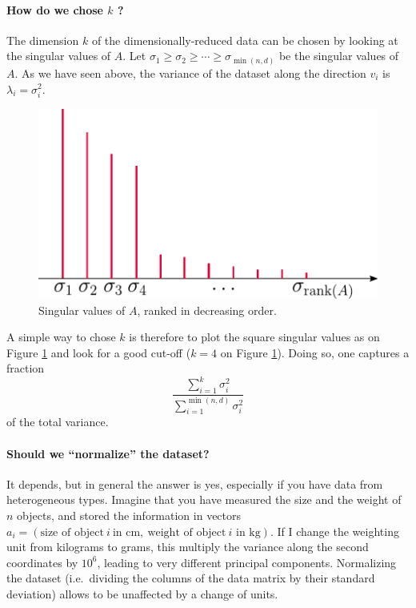 \documentclass[11pt,nocut]{article}
\begin{document}
\paragraph{How do we chose $k$ ?}
The dimension $k$ of the dimensionally-reduced data can be chosen by looking at the singular values of $A$. Let $\sigma_1 \geq \sigma_2 \geq \cdots \geq \sigma_{\min(n,d)}$ be the singular values of $A$. As we have seen above, the variance of the dataset along the direction $v_i$ is $\lambda_i = \sigma_i^2$.

\begin{figure}[h!]
	\begin{center}
	\includegraphics[width = 0.7\linewidth]{figures/elbow.pdf}
	\end{center}
	\caption{Singular values of $A$, ranked in decreasing order.}
	\label{fig:elbow}
\end{figure}

A simple way to chose $k$ is therefore to plot the square singular values as on Figure \ref{fig:elbow} and look for a good cut-off ($k=4$ on Figure \ref{fig:elbow}). Doing so, one captures a fraction
$$
\frac{\sum_{i=1}^k \sigma_i^2}{\sum_{i=1}^{\min(n,d)} \sigma_i^2}
$$
of the total variance.

\paragraph{Should we ``normalize'' the dataset?}
It depends, but in general the answer is yes, especially if you have data from heterogeneous types.
Imagine that you have measured the size and the weight of $n$ objects, and stored the information in vectors $a_i= (\text{size of object} \ i \ \text{in cm}, \ \text{weight of object} \ i \text{ in kg})$.
If I change the weighting unit from kilograms to grams, this multiply the variance along the second coordinates by $10^6$, leading to very different principal components.
Normalizing the dataset (i.e.\ dividing the columns of the data matrix by their standard deviation) allows to be unaffected by a change of units.
\end{document}
